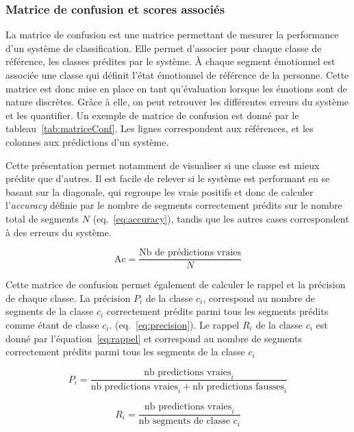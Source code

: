 \subsubsection{Matrice de confusion et scores associés}
La matrice de confusion est une matrice permettant de mesurer la performance d'un système de classification. Elle permet d'associer pour chaque classe de référence, les classes prédites par le système.
À chaque segment émotionnel est associée une classe qui définit l'état émotionnel de référence de la personne. Cette matrice est donc mise en place en tant qu'évaluation lorsque les émotions sont de nature discrètes. Grâce à elle, on peut retrouver les différentes erreurs du système et les quantifier. Un exemple de matrice de confusion est donné par le tableau~\ref{tab:matriceConf}. Les lignes correspondent aux références, et les colonnes aux prédictions d'un système.


%

Cette présentation permet notamment de visualiser si une classe est mieux prédite que d'autres. Il est facile de relever si le système est performant en se basant sur la diagonale, qui regroupe les vrais positifs et donc de calculer l'\textit{accuracy} définie par le nombre de segments correctement prédits sur le nombre total de segments $N$ (eq.~\ref{eq:accuracy}), tandis que les autres cases correspondent à des erreurs du système.

\begin{equation}
\text{Ac} = \dfrac{\text{Nb de prédictions vraies}}{N}
\end{equation}\label{eq:accuracy}

Cette matrice de confusion permet également de calculer le rappel et la précision de chaque classe. La précision $P_i$ de la classe $c_i$, correspond au nombre de segments de la classe $c_i$ correctement prédits parmi tous les segments prédits comme étant de classe $c_i$. (eq.~\ref{eq:precision}). Le rappel $R_i$ de la classe $c_i$ est donné par l'équation~\ref{eq:rappel} et correspond au nombre de segments correctement prédits parmi tous les segments de la classe $c_i$

\begin{equation}
  P_i = \frac{\text{nb predictions vraies}_i}{\text{nb predictions vraies}_i + \text{nb predictions fausses}_i}
  \label{eq:precision}
\end{equation}

\begin{equation}
  R_i = \frac{\text{nb predictions vraies}_i}{\text{nb segments de classe } c_i}
  \label{eq:rappel}
\end{equation}

